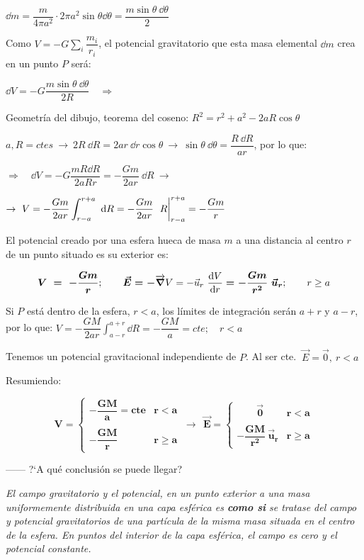 $\dd m=\dfrac m{4\pi a^2}\cdot 2\pi a^2 \sin \theta \dd \theta = \dfrac{m \sin \theta \ \dd \theta}2$

Como $\displaystyle V=-G \sum_i \dfrac {m_i}{r_i}$, el potencial gravitatorio que esta masa elemental $\dd m$ crea en un punto $P$ será:

$\dd V =- G \dfrac{m \sin \theta \ \dd \theta}{2R} \quad \Rightarrow$

Geometría del dibujo, teorema del coseno: $R^2=r^2+a^2-2aR\cos \theta$

$a, R = ctes \ \to \ 2R \ \dd R=2ar \ \dd r \cos \theta \ \to \ \sin \theta \ \dd \theta =\dfrac {R \ \dd R}{ar}$, por lo que:

$\Rightarrow \quad \dd V=-G\dfrac{m R \dd R}{2aRr}=-\dfrac{Gm}{2ar} \ \dd R \ \to $

$\to \  V=-\dfrac{Gm}{2ar} \displaystyle \int_{r-a}^{r+a} \ \dd R 
=-\dfrac{Gm}{2ar} \ \eval{ R }_{r-a}^{r+a}= -\dfrac{Gm}{r} $

El potencial creado por una esfera hueca de masa $m$ a una distancia al centro $r$ de un punto situado es su exterior es:

$$\boldsymbol{ V \ = \  -\dfrac{Gm}{r}};  \qquad \boldsymbol{ \vec E=-}\overrightarrow{\grad} V =-\vec u_r \ \displaystyle \dv{V}{r} \boldsymbol{ = -\dfrac{Gm}{r^2} \ \vec u_r}; \qquad r\geq a$$

Si $P$ está dentro de la esfera, $r<a$, los límites de integración serán $a+r$ y $a-r$, por lo que:
$V=-\dfrac{GM}{2ar} \displaystyle \int_{a-r}^{a+r} \dd R
=-\dfrac{GM}{a}=cte;\quad r<a$

Tenemos un potencial gravitacional independiente de $P$. Al ser cte. $\ \vec E =\vec 0,\ r<a$

Resumiendo:

$$\boldsymbol{
V=\begin{cases}
-\dfrac{GM}{a}=cte & r<a \\ \\ 
-\dfrac{GM}{r} & r\geq a	
\end{cases} \ \rightarrow \ 
\ \vec E=
\begin{cases}
	\qquad \vec 0 & r<a \\ \\ 
	-\dfrac{GM}{r^2}\ \vec u_r & r\geq a	
\end{cases}
}$$


------ ?`A qué conclusión se puede llegar?

\emph{El campo gravitatorio y el potencial, en un punto exterior a una masa uniformemente distribuida en una capa esférica es \textbf{como si} se tratase del campo y potencial gravitatorios de una partícula de la misma masa situada en el centro de la esfera. En puntos del interior de la capa esférica, el campo es cero y el potencial constante.}

